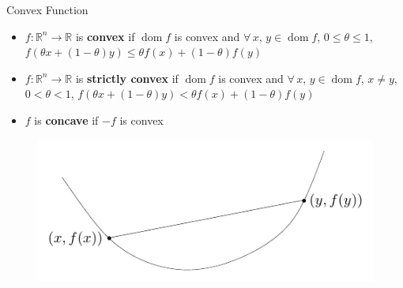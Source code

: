 \documentclass[10pt]{beamer}
\newcommand{\ds}{\displaystyle}
\DeclareMathOperator*{\dom}{dom}
\theoremstyle{definition}
\begin{document}
\begin{frame}{Convex Function}

\begin{itemize}
  \item $f:\mathbb{R}^n\to\mathbb{R}$ is {\bf convex} if $\dom f$ is convex and $\forall\,x,\,y\in\dom f$, $0\leqslant\theta\leqslant 1$, $\ds f(\theta x + (1 - \theta)y)\leqslant\theta f(x) + (1 - \theta) f(y)$
  \item $f:\mathbb{R}^n\to\mathbb{R}$ is {\bf strictly convex} if $\dom f$ is convex and $\forall\,x,\,y\in\dom f$, $x\ne y$, $0 < \theta < 1$, $\ds f(\theta x + (1 - \theta)y) < \theta f(x) + (1 - \theta) f(y)$
  \item $f$ is {\bf concave} if $-f$ is convex
\end{itemize}
\begin{figure}[!htbp]
  \centering
  \includegraphics[scale=1,page=1]{fig/note06/03.pdf}
\end{figure}

\end{frame}
\end{document}
